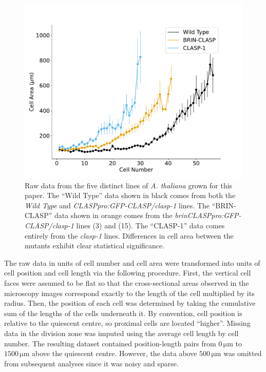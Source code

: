 \documentclass[referee,pdflatex,sn-mathphys-num]{sn-jnl}
\newcommand{\um}{\,\unit{\micro\metre}}
\begin{document}
\begin{appendices}
\begin{figure}
  \centering
  \includegraphics[width=\textwidth]{data-unprocessed.pdf}
  \caption{Raw data from the five distinct lines of \emph{A. thaliana} grown for this paper.
  The ``Wild Type'' data shown in black comes from both the \emph{Wild Type} and \emph{CLASPpro:GFP-CLASP/clasp-1} lines.
The ``BRIN-CLASP'' data shown in orange comes from the \emph{brinCLASPpro:GFP-CLASP/clasp-1} lines (3) and (15).
The ``CLASP-1'' data comes entirely from the \emph{clasp-1} lines.
Differences in cell area between the mutants exhibit clear statistical significance. }
  \label{data-unprocesed}
\end{figure}

The raw data in units of cell number and cell area were transformed into units of cell position and cell length via the following procedure.
First, the vertical cell faces were assumed to be flat so that the cross-sectional areas observed in the microscopy images correspond exactly to the length of the cell multiplied by its radius.
Then, the position of each cell was determined by taking the cumulative sum of the lengths of the cells underneath it.
By convention, cell position is relative to the quiescent centre, so proximal cells are located ``higher''.
Missing data in the division zone was imputed using the average cell length by cell number.
The resulting dataset contained position-length pairs from $0\um$ to $1500\um$ above the quiescent centre.
However, the data above $500\um$ was omitted from subsequent analyses since it was noisy and sparse. 


\end{appendices}
\end{document}
